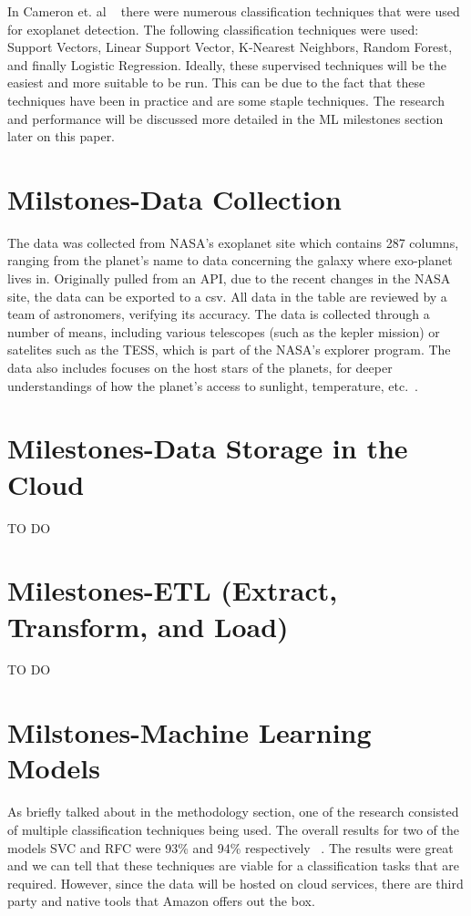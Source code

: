 \documentclass[letterpaper, 10 pt, conference]{ieeeconf}  %
\begin{document}
In Cameron et. al ~\cite{MLApproachesExoPlanets} there were numerous classification techniques that were used for exoplanet detection. The following classification techniques were used: Support Vectors, Linear Support Vector, K-Nearest Neighbors, Random Forest, and finally Logistic Regression. Ideally, these supervised techniques will be the easiest and more suitable to be run. This can be due to the fact that these techniques have been in practice and are some staple techniques. The research and performance will be discussed more detailed in the ML milestones section later on this paper.

\section{Milstones-Data Collection}

The data was collected from NASA's exoplanet site which contains 287 columns, ranging from the planet's name to data concerning the galaxy where exo-planet lives in. Originally pulled from an API, due to the recent changes in the NASA site, the data can be exported to a csv. All data in the table are reviewed by a team of astronomers, verifying its accuracy. The data is collected through a number of means, including various telescopes (such as the kepler mission) or satelites such as the TESS, which is part of the NASA's explorer program. The data also includes focuses on the host stars of the planets, for deeper understandings of how the planet's access to sunlight, temperature, etc.~\cite{nasaExoplanetArchive}. 

\section{Milestones-Data Storage in the Cloud}

TO DO

\section{Milestones-ETL (Extract, Transform, and Load)}

TO DO

\section{Milstones-Machine Learning Models}

As briefly talked about in the methodology section, one of the research consisted of multiple classification techniques being used. The overall results for two of the models SVC and RFC were 93\% and 94\% respectively ~\cite{MLApproachesExoPlanets}. The results were great and we can tell that these techniques are viable for a classification tasks that are required. However, since the data will be hosted on cloud services, there are third party and native tools that Amazon offers out the box.
\end{document}
